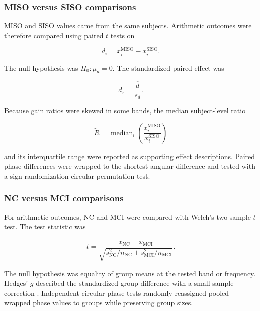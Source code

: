 \documentclass[12pt]{article}
\begin{document}
\subsubsection{MISO versus SISO comparisons}

MISO and SISO values came from the same subjects. Arithmetic outcomes were
therefore compared using paired $t$ tests on

\begin{equation}
    d_i=x_i^{\mathrm{MISO}}-x_i^{\mathrm{SISO}}.
\end{equation}

The null hypothesis was $H_0:\mu_d=0$. The standardized paired effect was

\begin{equation}
    d_z=\frac{\overline{d}}{s_d}.
\end{equation}

Because gain ratios were skewed in some bands, the median subject-level ratio

\begin{equation}
    \widetilde{R}=\operatorname{median}_i
    \left(\frac{x_i^{\mathrm{MISO}}}{x_i^{\mathrm{SISO}}}\right)
    \label{eq:median_ratio}
\end{equation}

and its interquartile range were reported as supporting effect descriptions.
Paired phase differences were wrapped to the shortest angular difference and
tested with a sign-randomization circular permutation test.

\subsubsection{NC versus MCI comparisons}

For arithmetic outcomes, NC and MCI were compared with Welch's two-sample
$t$ test. The test statistic was

\begin{equation}
    t=\frac{\overline{x}_{\mathrm{NC}}-
    \overline{x}_{\mathrm{MCI}}}
    {\sqrt{s_{\mathrm{NC}}^2/n_{\mathrm{NC}}+
    s_{\mathrm{MCI}}^2/n_{\mathrm{MCI}}}}.
    \label{eq:welch_t}
\end{equation}

The null hypothesis was equality of group means at the tested band or
frequency. Hedges' $g$ described the standardized group difference with a
small-sample correction \cite{Hedges1981}. Independent circular phase tests
randomly reassigned pooled wrapped phase values to groups while preserving
group sizes.
\end{document}
